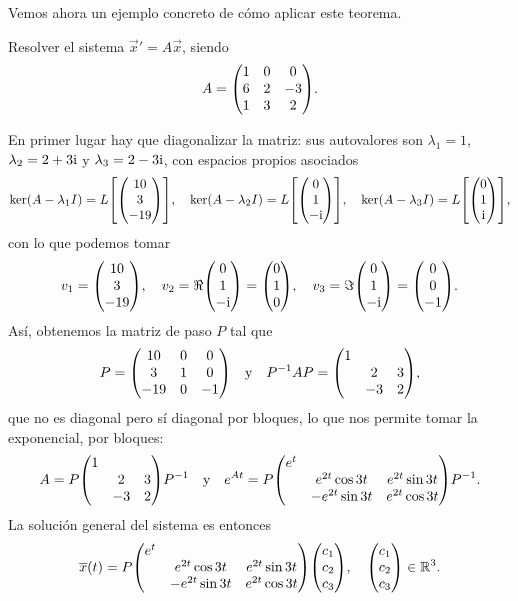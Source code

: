 \documentclass[../ecuaciones_diferenciales.tex]{subfiles}
\begin{document}
Vemos ahora un ejemplo concreto de cómo aplicar este teorema.

\begin{example}
	Resolver el sistema \(\vec{x}' = A\vec{x}\), siendo
	\[A = \mat{1 & 0 & 0 \\ 6 & 2 & -3 \\ 1 & 3 & 2}.\]
\end{example}

\begin{solution}
	En primer lugar hay que diagonalizar la matriz: sus autovalores son
	\(\lambda_1 = 1\), \(\lambda_2 = 2 + 3\mathrm{i}\) y \(\lambda_3 = 2 - 3\mathrm{i}\), 
	con espacios propios asociados
	\[\ker(A - \lambda_1 I) = L \left[ \mat{10 \\ 3 \\ -19} \right], \quad
		\ker(A - \lambda_2 I) = L \left[ \mat{0 \\ 1 \\ -\iu} \right], \quad
		\ker(A - \lambda_3 I) = L \left[\mat{0 \\ 1 \\ \iu} \right],\]
	con lo que podemos tomar
	\[v_1 = \mat{10 \\ 3 \\ -19}, 
		\quad 
		v_2 = \Re \mat{0 \\ 1 \\ -\iu} 
		= \mat{0 \\ 1 \\ 0}, 
		\quad 
		v_3 = \Im \mat{0 \\ 1 \\ -\iu} = \mat{0 \\ 0 \\ -1}.\]
	Así, obtenemos la matriz de paso \(P\) tal que
	\[P = \mat{10 & 0 & 0 \\ 3 & 1 & 0 \\ -19 & 0 & -1}
		\quad \text{y} \quad
		P^{-1}AP = \mat{1 & & \\ & 2 & 3 \\ & -3 & 2},\]
	que no es diagonal pero sí diagonal por bloques, lo que nos permite tomar 
	la exponencial, por bloques:
	\[A = P \mat{1 & & \\ & 2 & 3 \\ & -3 & 2} P^{-1}
		\quad \text{y} \quad
		e^{At} = P \mat{e^t & & \\ & e^{2t} \cos 3t & e^{2t} \sin 3t \\ &
		-e^{2t} \sin 3t & e^{2t} \cos 3t} P^{-1}.\]
	La solución general del sistema es entonces
	\[\vec{x}(t) = P \mat{e^t & & \\ & e^{2t} \cos 3t & e^{2t} \sin 3t \\ &
		-e^{2t} \sin 3t & e^{2t} \cos 3t} \mat{c_1 \\ c_2 \\ c_3}, \quad
		\mat{c_1 \\ c_2 \\ c_3} \in \R^3.\]
\end{solution}
\end{document}
